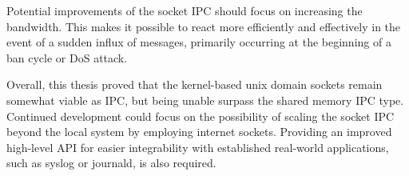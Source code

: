 Potential improvements of the socket \ac{IPC} should focus on increasing the bandwidth.
This makes it possible to react more efficiently and effectively in the event of a sudden influx of messages, primarily occurring at the beginning of a ban cycle or \ac{DoS} attack.

Overall, this thesis proved that the kernel-based unix domain sockets remain somewhat viable as \ac{IPC}, but being unable surpass the shared memory \ac{IPC} type.
Continued development could focus on the possibility of scaling the socket \ac{IPC} beyond the local system by employing internet sockets.
Providing an improved high-level \ac{API} for easier integrability with established real-world applications, such as syslog or journald, is also required.